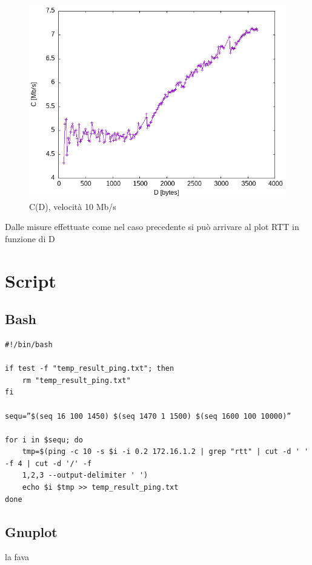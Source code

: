 \documentclass{article}
\begin{document}
\begin{figure}[h!]
\centering
\includegraphics[scale=0.5]{speed-10Mbps_Direct.png}
\caption{C(D), velocità 10 Mb/s}
\label{C_D_10_dir}
\end{figure} 


Dalle misure effettuate come nel caso precedente si può arrivare al plot RTT in funzione di D 


\appendix
\newpage
\section{Script}
\subsection{Bash}
\label{script_bash}
\begin{verbatim}
#!/bin/bash

if test -f "temp_result_ping.txt"; then
    rm "temp_result_ping.txt"   
fi

sequ=”$(seq 16 100 1450) $(seq 1470 1 1500) $(seq 1600 100 10000)”

for i in $sequ; do
    tmp=$(ping -c 10 -s $i -i 0.2 172.16.1.2 | grep "rtt" | cut -d ' ' -f 4 | cut -d '/' -f
    1,2,3 --output-delimiter ' ')
    echo $i $tmp >> temp_result_ping.txt
done
\end{verbatim}
\subsection{Gnuplot}
la fava
\end{document}
